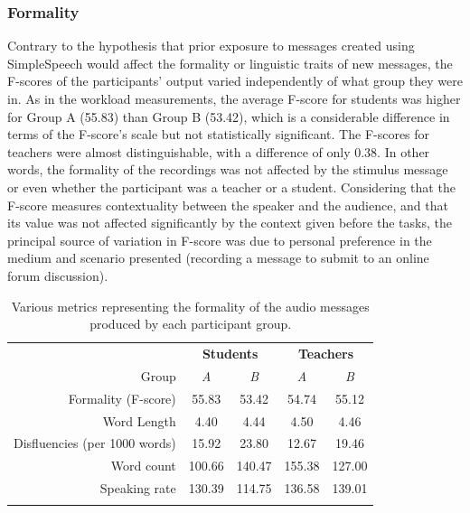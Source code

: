 \subsubsection{Formality}
Contrary to the hypothesis that prior exposure to messages created using SimpleSpeech would affect the formality or linguistic traits of new messages, the F-scores of the participants' output varied independently of what group they were in.
As in the workload measurements, the average F-score for students was higher for Group A (55.83) than Group B (53.42), which is a considerable difference in terms of the F-score's scale but not statistically significant. 
The F-scores for teachers were almost distinguishable, with a difference of only 0.38.
In other words, the formality of the recordings was not affected by the stimulus message or even whether the participant was a teacher or a student.
Considering that the F-score measures contextuality between the speaker and the audience, and that its value was not affected significantly by the context given before the tasks, the principal source of variation in F-score was due to personal preference in the medium and scenario presented (recording a message to submit to an online forum discussion).

\begin{table}
	\centering
	\begin{tabular}{r c c c c}
		\toprule
        & \multicolumn{2}{c}{\textbf{Students}} & \multicolumn{2}{c}{\textbf{Teachers}} \\
        \cmidrule(lr){2-3} \cmidrule(lr){4-5}
        Group                         & \textit{A}    & \textit{B}   & \textit{A}    & \textit{B}   \\
        Formality (F-score)           & 55.83         & 53.42        & 54.74         & 55.12        \\
        Word Length                   & 4.40          & 4.44         & 4.50          & 4.46         \\
        Disfluencies (per 1000 words) & 15.92         & 23.80        & 12.67         & 19.46        \\
        Word count                    & 100.66        & 140.47       & 155.38        & 127.00       \\
        Speaking rate                 & 130.39        & 114.75       & 136.58        & 139.01       \\
		\bottomrule \\
	\end{tabular}
	\caption{Various metrics representing the formality of the audio messages produced by each participant group.}~\label{tab:table2}
\end{table}

